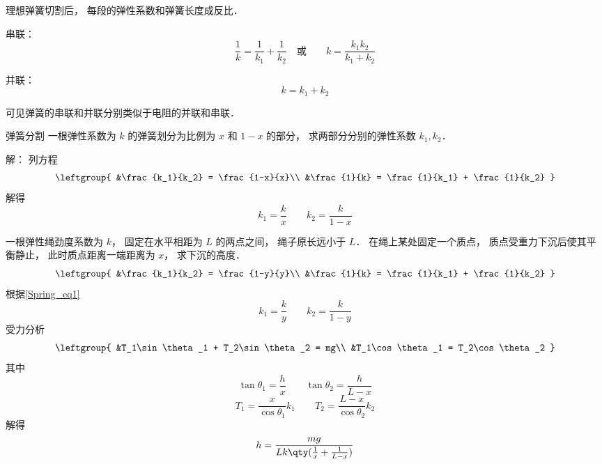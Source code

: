 
\begin{issues}
\issueDraft
\end{issues}


理想弹簧切割后， 每段的弹性系数和弹簧长度成反比．

串联：
\begin{equation}
\frac{1}{k} = \frac{1}{k_1} + \frac{1}{k_2}
\quad \text{或} \qquad
k = \frac{k_1 k_2}{k_1 + k_2}
\end{equation}

并联：
\begin{equation}
k = k_1 + k_2
\end{equation}

可见弹簧的串联和并联分别类似于电阻的并联和串联．


\begin{example}{弹簧分割}
一根弹性系数为 $k$ 的弹簧划分为比例为 $x$ 和 $1-x$ 的部分， 求两部分分别的弹性系数 $k_1, k_2$．

解： 列方程
\begin{equation}
\leftgroup{
&\frac{k_1}{k_2} = \frac{1-x}{x}\\
&\frac{1}{k} = \frac{1}{k_1} + \frac{1}{k_2}
}
\end{equation}
解得
\begin{equation}\label{Spring_eq1}
k_1 = \frac{k}{x} \qquad k_2 = \frac{k}{1-x}
\end{equation}
\end{example}

\begin{example}{}
一根弹性绳劲度系数为 $k$， 固定在水平相距为 $L$ 的两点之间， 绳子原长远小于 $L$． 在绳上某处固定一个质点， 质点受重力下沉后使其平衡静止， 此时质点距离一端距离为 $x$， 求下沉的高度．
\begin{equation}
\leftgroup{
&\frac{k_1}{k_2} = \frac{1-y}{y}\\
&\frac{1}{k} = \frac{1}{k_1} + \frac{1}{k_2}
}
\end{equation}
根据\autoref{Spring_eq1}
\begin{equation}
k_1 = \frac{k}{y} \qquad
k_2 = \frac{k}{1-y}
\end{equation}
受力分析
\begin{equation}
\leftgroup{
&T_1\sin\theta_1 + T_2\sin\theta_2 = mg\\
&T_1\cos\theta_1 = T_2\cos\theta_2
}
\end{equation}
其中
\begin{equation}
\tan\theta_1 = \frac{h}{x}
\qquad
\tan\theta_2 = \frac{h}{L-x}
\end{equation}
\begin{equation}
T_1 = \frac{x}{\cos\theta_1} k_1 \qquad
T_2 = \frac{L-x}{\cos\theta_2} k_2
\end{equation}
解得
\begin{equation}
h = \frac{mg}{Lk\qty(\frac{1}{x} + \frac{1}{L-x})}
\end{equation}
\end{example}
